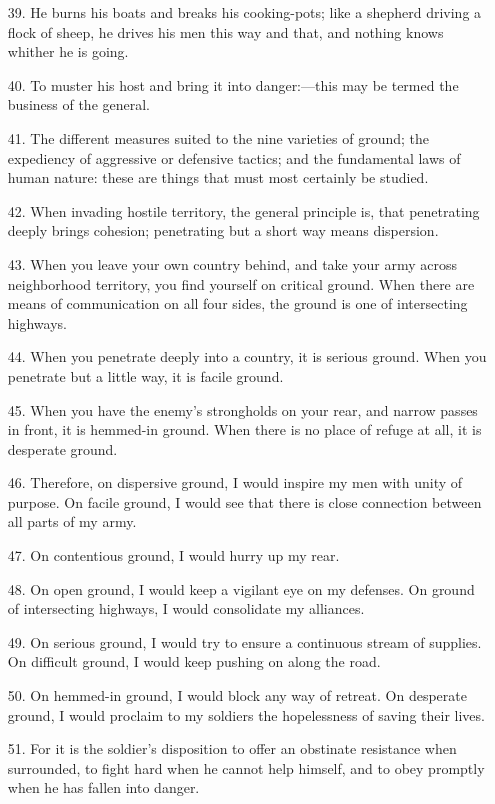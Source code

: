 \documentclass[11pt,openany]{memoir}
\newcommand{\enumeratemargin}{1.30em}
\begin{document}
\begin{enumerate}[leftmargin=\enumeratemargin]
\item[39.] He burns his boats and breaks his cooking-pots; like a shepherd driving a flock of sheep, he drives his men this way and that, and nothing knows whither he is going.
\item[40.] To muster his host and bring it into danger:---this may be termed the business of the general.
\item[41.] The different measures suited to the nine varieties of ground; the expediency of aggressive or defensive tactics; and the fundamental laws of human nature: these are things that must most certainly be studied.
\item[42.] When invading hostile territory, the general principle is, that penetrating deeply brings cohesion; penetrating but a short way means dispersion.
\item[43.] When you leave your own country behind, and take your army across neighborhood territory, you find yourself on critical ground. When there are means of communication on all four sides, the ground is one of intersecting highways.
\item[44.] When you penetrate deeply into a country, it is serious ground. When you penetrate but a little way, it is facile ground.
\item[45.] When you have the enemy's strongholds on your rear, and narrow passes in front, it is hemmed-in ground. When there is no place of refuge at all, it is desperate ground.
\item[46.] Therefore, on dispersive ground, I would inspire my men with unity of purpose. On facile ground, I would see that there is close connection between all parts of my army.
\item[47.] On contentious ground, I would hurry up my rear.
\item[48.] On open ground, I would keep a vigilant eye on my defenses. On ground of intersecting highways, I would consolidate my alliances.
\item[49.] On serious ground, I would try to ensure a continuous stream of supplies. On difficult ground, I would keep pushing on along the road.
\item[50.] On hemmed-in ground, I would block any way of retreat. On desperate ground, I would proclaim to my soldiers the hopelessness of saving their lives.
\item[51.] For it is the soldier's disposition to offer an obstinate resistance when surrounded, to fight hard when he cannot help himself, and to obey promptly when he has fallen into danger.

\end{enumerate}
\end{document}
